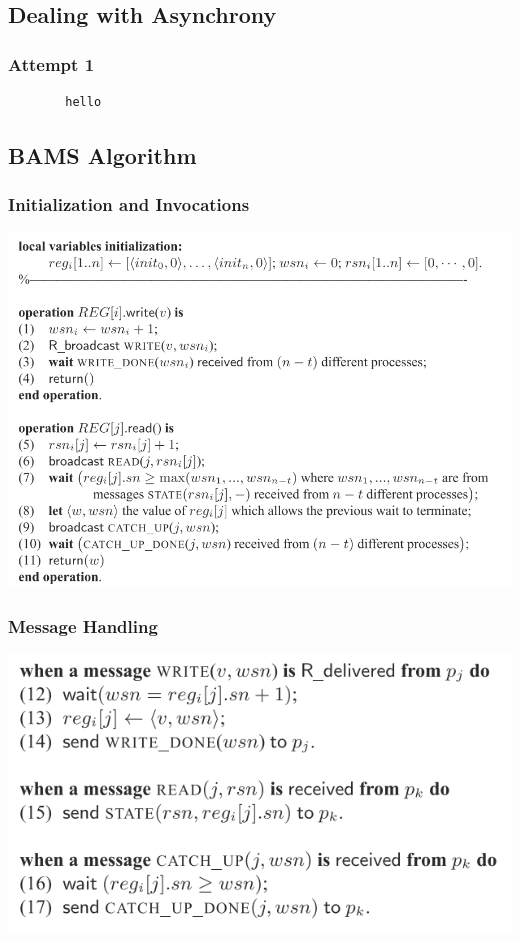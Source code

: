 \subsection{Dealing with Asynchrony}
\begin{frame}[fragile]
    \frametitle{Attempt 1}
    \begin{verbatim}
        hello
    \end{verbatim}
\end{frame}

\subsection{BAMS Algorithm}

\begin{frame}
    \frametitle{Initialization and Invocations}
    \begin{center}
        \includegraphics[scale=.7]{alg1.png}
    \end{center}
\end{frame}
\begin{frame}
    \frametitle{Message Handling}
    \begin{center}
        \includegraphics[scale=.7]{alg2.png}
    \end{center}
\end{frame}